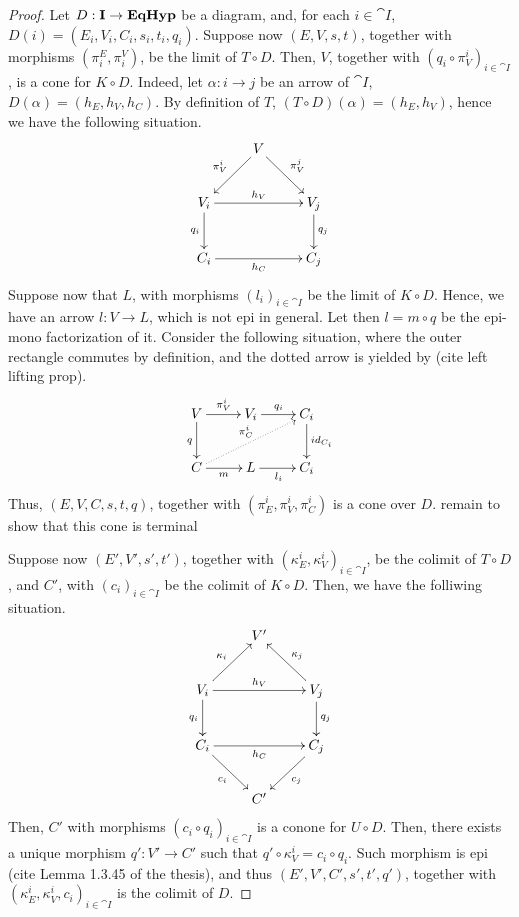 \begin{proof}
	Let $D: \mathbf{I}\to \textbf{\textup{EqHyp}}$ be a diagram, and, for each $i \in \cat{I}$, $D(i) = (E_i, V_i, C_i, s_i, t_i, q_i)$.
	Suppose now $(E, V, s, t)$, together with morphisms $(\pi_i^E, \pi_i^V)$, be the limit of $T \circ D$.
	Then, $V$, together with $(q_i\circ \pi_V^i)_{i\in \cat I}$, is a cone for $K \circ D$. Indeed, let $\alpha: i \to j$ be an arrow of $\cat I$, $D(\alpha) = (h_E,h_V, h_C)$.
	By definition of $T$, $(T \circ D)(\alpha) = (h_E, h_V)$, hence we have the following situation.
	\[\xymatrix{
		& V \ar[dl]_{\pi_V^i} \ar[dr]^{\pi_V^j} & \\V_i\ar[rr]^{h_V}\ar[d]_{q_i}&&V_j\ar[d]^{q_j}\\C_i\ar[rr]_{h_C}&&C_j
	}\]
	Suppose now that $L$, with morphisms $(l_i)_{i\in \cat I}$ be the limit of $K\circ D$. Hence, we have an arrow $l:V \to L$, which is not epi in general.
	Let then $l = m \circ q$ be the epi-mono factorization of it. Consider the following situation, where the outer rectangle commutes by definition, and the dotted arrow is yielded by ({\color{red}cite left lifting prop}).
	\[\xymatrix{
			V\ar[r]^{\pi_V^i}\ar[d]_{q}&V_i\ar[r]^{q_i}&C_i\ar[d]^{\id{C_i}}\\C\ar[r]_{m}\ar@{.>}[urr]^{\pi_C^i}&L\ar[r]_{l_i}&{C_i}
	}\]
	Thus, $(E, V, C, s, t, q)$, together with $(\pi_E^i, \pi_V^i, \pi_C^i)$ is a cone over $D$. {\color{red} remain to show that this cone is terminal}
	
	Suppose now $(E', V', s', t')$, together with $(\kappa_E^i, \kappa_V^i)_{i \in \cat I}$, be the colimit of $T \circ D$, and $C'$, with $(c_i)_{i \in \cat I}$ be the colimit of $K \circ D$.
	Then, we have the folliwing situation.
	\[\xymatrix{
								  &  {V'} &                             \\
		V_i \ar[ur]^{\kappa_i} \ar[rr]^{h_V} \ar[d]_{q_i} && V_j \ar[ul]_{\kappa_j} \ar[d]^{q_j}\\
		C_i \ar[dr]_{c_i}      \ar[rr]_{h_C}              &&C_j  \ar[dl]^{c_j}                  \\
								  &  {C'} &
	}\]
	Then, $C'$ with morphisms $(c_i \circ q_i)_{i\in \cat I}$ is a conone for $U \circ D$. Then, there exists a unique morphism $q': V' \to C'$ such that $q'\circ \kappa_V^i = c_i\circ q_i$.
	Such morphism is epi ({\color{red}cite Lemma 1.3.45 of the thesis}), and thus $(E', V', C', s', t', q')$, together with $(\kappa_E^i, \kappa_V^i, c_i)_{i\in \cat I}$ is the colimit of $D$.
	
\end{proof}

